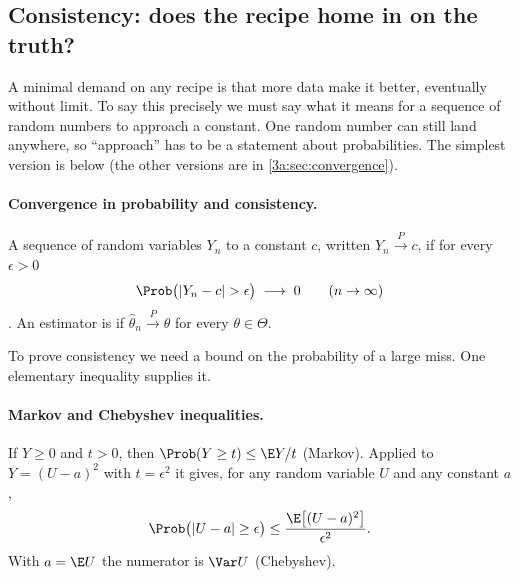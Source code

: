\subsection{Consistency: does the recipe home in on the truth?}
\label{3a:sec:consistency}

A minimal demand on any recipe is that more data make it better, eventually
without limit. To say this precisely we must say what it means for a
sequence of random numbers to approach a constant. One random number can
still land anywhere, so ``approach'' has to be a statement about
probabilities. The simplest version is below (the other versions are in
\cref{3a:sec:convergence}).

\paragraph{Convergence in probability and consistency.}
A sequence of random variables $Y_n$  to a
constant $c$, written $Y_n\xrightarrow{\;P\;}c$, if for every $\epsilon>0$
\begin{equation}
  \Prob\bigl(|Y_n-c|>\epsilon\bigr)\;\longrightarrow\;0\qquad(n\to\infty)
  \label{3a:eq:conv-prob}
\end{equation}
. An estimator is  if
$\hat\theta_n\xrightarrow{P}\theta$ for every $\theta\in\Theta$.

To prove consistency we need a bound on the probability of a large miss.
One elementary inequality supplies it.

\paragraph{Markov and Chebyshev inequalities.}
If $Y\ge0$ and $t>0$, then $\Prob(Y\ge t)\le\E Y/t$ (Markov). Applied to
$Y=(U-a)^2$ with $t=\epsilon^2$ it gives, for any random variable $U$ and
any constant $a$,
\begin{equation}
  \Prob\bigl(|U-a|\ge\epsilon\bigr)\le\frac{\E\bigl[(U-a)^2\bigr]}{\epsilon^2}.
  \label{3a:eq:chebyshev}
\end{equation}
With $a=\E U$ the numerator is $\Var U$ (Chebyshev).

